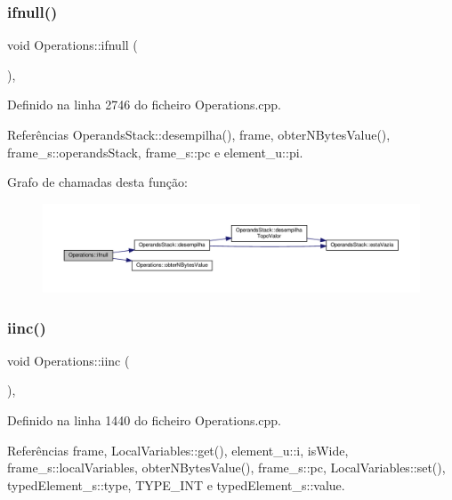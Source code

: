 \subsubsection{\texorpdfstring{ifnull()}{ifnull()}}
{\footnotesize\ttfamily void Operations\+::ifnull (\begin{DoxyParamCaption}{ }\end{DoxyParamCaption})\hspace{0.3cm}{\ttfamily [static]}, {\ttfamily [private]}}



Definido na linha 2746 do ficheiro Operations.\+cpp.



Referências Operands\+Stack\+::desempilha(), frame, obter\+N\+Bytes\+Value(), frame\+\_\+s\+::operands\+Stack, frame\+\_\+s\+::pc e element\+\_\+u\+::pi.

Grafo de chamadas desta função\+:
\nopagebreak
\begin{figure}[H]
\begin{center}
\leavevmode
\includegraphics[width=350pt]{classOperations_a030f5995f8f357254e543d0cbce2d189_cgraph}
\end{center}
\end{figure}
\mbox{\label{classOperations_a9934f9369192b10a978c7d6950592c42}} 
\subsubsection{\texorpdfstring{iinc()}{iinc()}}
{\footnotesize\ttfamily void Operations\+::iinc (\begin{DoxyParamCaption}{ }\end{DoxyParamCaption})\hspace{0.3cm}{\ttfamily [static]}, {\ttfamily [private]}}



Definido na linha 1440 do ficheiro Operations.\+cpp.



Referências frame, Local\+Variables\+::get(), element\+\_\+u\+::i, is\+Wide, frame\+\_\+s\+::local\+Variables, obter\+N\+Bytes\+Value(), frame\+\_\+s\+::pc, Local\+Variables\+::set(), typed\+Element\+\_\+s\+::type, T\+Y\+P\+E\+\_\+\+I\+NT e typed\+Element\+\_\+s\+::value.

